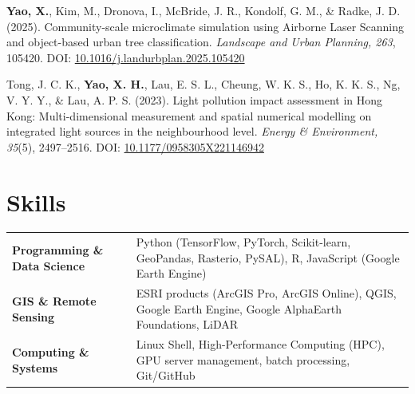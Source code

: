 \documentclass[a4paper,12pt]{article}
\begin{document}
\begin{etaremune}[leftmargin=1.5em, itemsep=0.7em, start=2]
    \item \textbf{Yao, X.}, Kim, M., Dronova, I., McBride, J. R., Kondolf, G. M., \& Radke, J. D. (2025). Community-scale microclimate simulation using Airborne Laser Scanning and object-based urban tree classification. \textit{Landscape and Urban Planning, 263}, 105420. DOI: \href{https://doi.org/10.1016/j.landurbplan.2025.105420}{10.1016/j.landurbplan.2025.105420}

    \item Tong, J. C. K., \textbf{Yao, X. H.}, Lau, E. S. L., Cheung, W. K. S., Ho, K. K. S., Ng, V. Y. Y., \& Lau, A. P. S. (2023). Light pollution impact assessment in Hong Kong: Multi-dimensional measurement and spatial numerical modelling on integrated light sources in the neighbourhood level. \textit{Energy \& Environment, 35}(5), 2497--2516. DOI: \href{https://doi.org/10.1177/0958305X221146942}{10.1177/0958305X221146942}

\end{etaremune}


\section{Skills}
\begin{tabularx}{\linewidth}{@{}l X@{}}
\textbf{Programming \& Data Science} & 
Python (TensorFlow, PyTorch, Scikit-learn, GeoPandas, Rasterio, PySAL), R, JavaScript (Google Earth Engine) \\ [3pt]
\textbf{GIS \& Remote Sensing} & 
ESRI products (ArcGIS Pro, ArcGIS Online), QGIS, Google Earth Engine, Google AlphaEarth Foundations, LiDAR \\ [3pt]
\textbf{Computing \& Systems} & 
Linux Shell, High-Performance Computing (HPC), GPU server management, batch processing, Git/GitHub \\
\end{tabularx}

\vfill
{}
\end{document}
